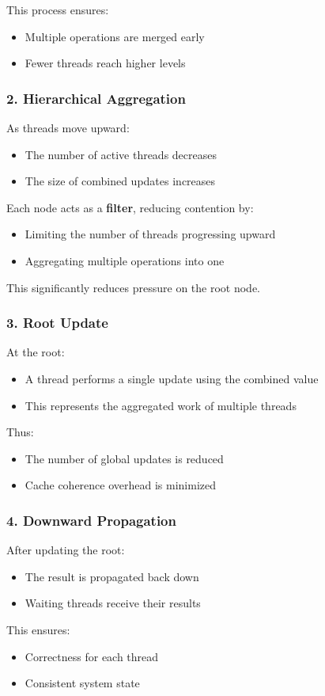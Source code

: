 \documentclass[11pt,a4paper]{article}
\begin{document}
This process ensures:
\begin{itemize}
    \item Multiple operations are merged early
    \item Fewer threads reach higher levels
\end{itemize}

\subsubsection*{2. Hierarchical Aggregation}

As threads move upward:
\begin{itemize}
    \item The number of active threads decreases
    \item The size of combined updates increases
\end{itemize}
Each node acts as a \textbf{filter}, reducing contention by:
\begin{itemize}
    \item Limiting the number of threads progressing upward
    \item Aggregating multiple operations into one
\end{itemize}
This significantly reduces pressure on the root node.

\subsubsection*{3. Root Update}

At the root:
\begin{itemize}
    \item A thread performs a single update using the combined value
    \item This represents the aggregated work of multiple threads
\end{itemize}
Thus:
\begin{itemize}
    \item The number of global updates is reduced
    \item Cache coherence overhead is minimized
\end{itemize}

\subsubsection*{4. Downward Propagation}

After updating the root:
\begin{itemize}
    \item The result is propagated back down
    \item Waiting threads receive their results
\end{itemize}
This ensures:
\begin{itemize}
    \item Correctness for each thread
    \item Consistent system state
\end{itemize}
\end{document}
